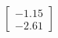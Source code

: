 \documentclass[preview]{standalone}
\begin{document}
\begin{align*}
\begin{bmatrix} -1.15 \\ -2.61 \end{bmatrix}
\end{align*}
\end{document}
